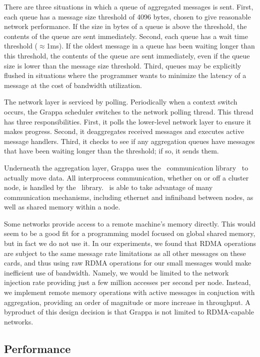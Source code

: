There are three situations in which a queue of aggregated messages is sent. First, each queue has a message size threshold of 4096 bytes, chosen to give reasonable network performance. If the size in bytes of a queue is above the threshold, the contents of the queue are sent immediately. Second, each queue has a wait time threshold ($\approx${1ms}). If the oldest message in a queue has been waiting longer than this threshold, the contents of the queue are sent immediately, even if the queue size is lower than the message size threshold.  Third, queues may be explicitly flushed in situations where the programmer wants to minimize the latency of a message at the cost of bandwidth utilization.

The network layer is serviced by polling. Periodically when a context switch occurs, the Grappa scheduler switches to the network polling thread. This thread has three responsibilities. First, it polls the lower-level network layer to ensure it makes progress. Second, it deaggregates received messages and executes active message handlers. Third, it checks to see if any aggregation queues have messages that have been waiting longer than the threshold; if so, it sends them.

Underneath the aggregation layer, Grappa uses the \gasnet~communication library~\cite{gasnet} to actually move data. All interprocess communication, whether on or off a cluster node, is handled by the \gasnet~library. \gasnet~is able to take advantage of many communication mechanisms, including ethernet and infiniband between nodes, as well as shared memory within a node.

Some networks provide access to a remote machine's memory directly. This would seem to be a good fit for a programming model focused on global shared memory, but in fact we do not use it. In our experiments, we found that RDMA operations are subject to the same message rate limitations as all other messages on these cards, and thus using raw RDMA operations for our small messages would make inefficient use of bandwidth. Namely, we would be limited to the network injection rate providing just a few million accesses per second per node.  Instead, we implement remote memory operations with active messages in conjuction with aggregation, providing an order of magnitude or more increase in throughput. A byproduct of this design decision is that Grappa is not limited to RDMA-capable networks.

\subsection{Performance}

